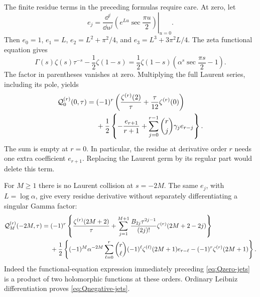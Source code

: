 The finite residue terms in the preceding formulas require care.
At zero, let
\begin{equation}\label{eq:mod-e}
 e_j=\left.\frac{\dd^j}{\dd u^j}
                 \left(e^{Lu}\sec\frac{\pi u}{2}\right)\right|_{u=0}.
\end{equation}
Then \(e_0=1\), \(e_1=L\),
\(e_2=L^2+\pi^2/4\), and
\(e_3=L^3+3\pi^2L/4\). The zeta functional equation gives
\[
 \Gamma(s)\zeta(s)\tau^{-s}-\frac12\zeta(1-s)
 =\frac12\zeta(1-s)
           \left(\alpha^s\sec\frac{\pi s}{2}-1\right).
\]
The factor in parentheses vanishes at zero. Multiplying the
full Laurent series, including its pole, yields
\begin{equation}\label{eq:Qzero-jets}
 \begin{split}
 {\cal Q}_0^{(r)}(0,\tau)
 ={}&(-1)^r\left(\frac{\zeta^{(r)}(2)}{\tau}
                  +\frac{\tau}{12}\zeta^{(r)}(0)\right)\\
 &+\frac12\left\{-\frac{e_{r+1}}{r+1}
        +\sum_{j=0}^{r-1}\binom rj\gamma_j e_{r-j}\right\}.
 \end{split}
\end{equation}
The sum is empty at \(r=0\). In particular, the residue at
derivative order \(r\) needs one extra coefficient \(e_{r+1}\).
Replacing the Laurent germ by its regular part would delete this
term.

For \(M\ge1\) there is no Laurent collision at \(s=-2M\).
The same \(e_j\), with \(L=\log\alpha\), give every residue
derivative without separately differentiating a singular Gamma
factor:
\begin{equation}\label{eq:Qnegative-jets}
 \begin{split}
 {\cal Q}_M^{(r)}(-2M,\tau)
 ={}&(-1)^r\left\{\frac{\zeta^{(r)}(2M+2)}{\tau}
    +\sum_{j=1}^{M+1}\frac{B_{2j}\tau^{2j-1}}{(2j)!}
                    \zeta^{(r)}(2M+2-2j)\right\}\\
 &+\frac12\left\{(-1)^M\alpha^{-2M}
      \sum_{\ell=0}^{r}\binom r\ell(-1)^\ell
                \zeta^{(\ell)}(2M+1)e_{r-\ell}
              -(-1)^r\zeta^{(r)}(2M+1)\right\}.
 \end{split}
\end{equation}
Indeed the functional-equation expression immediately preceding
\eqref{eq:Qzero-jets} is a product of two holomorphic functions
at these orders. Ordinary Leibniz differentiation proves
\eqref{eq:Qnegative-jets}.

